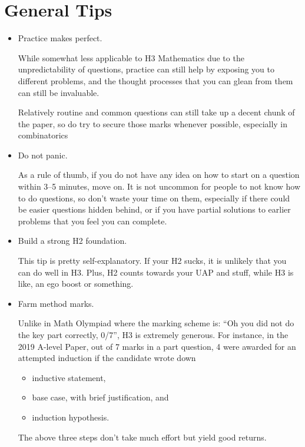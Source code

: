\documentclass[12pt,a4 paper]{article}
\begin{document}
\section*{General Tips}
\begin{itemize}
\item Practice makes perfect.

While somewhat less applicable to H3 Mathematics due to the unpredictability of questions, practice can still help by exposing you to different problems, and the thought processes that you can glean from them can still be invaluable. 

Relatively routine and common questions can still take up a decent chunk of the paper, so do try to secure those marks whenever possible, especially in combinatorics 

\item Do not panic.

As a rule of thumb, if you do not have any idea on how to start on a question within 3--5 minutes, move on. It is not uncommon for people to not know how to do questions, so don't waste your time on them, especially if there could be easier questions hidden behind, or if you have partial solutions to earlier problems that you feel you can complete.

\item Build a strong H2 foundation.

This tip is pretty self-explanatory. If your H2 sucks, it is unlikely that you can do well in H3. Plus, H2 counts towards your UAP and stuff, while H3 is like, an ego boost or something. 

\item Farm method marks.

Unlike in Math Olympiad where the marking scheme is: ``Oh you did not do the key part correctly, 0/7'', H3 is extremely generous. For instance, in the 2019 A-level Paper, out of 7 marks in a part question, 4 were awarded for an attempted induction if the candidate wrote down
\begin{itemize}
\item inductive statement,
\item base case, with brief justification, and
\item induction hypothesis.
\end{itemize}
The above three steps don’t take much effort but yield good returns. 
\end{itemize}
\end{document}

